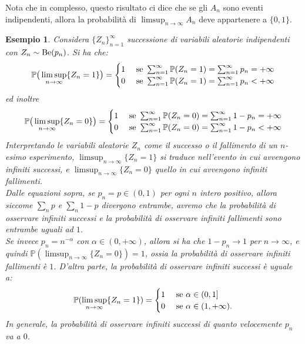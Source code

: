 \documentclass[11pt]{book}
\theoremstyle{Definizione}
\theoremstyle{TeoremaProposizioneLemmaCorollario}
\theoremstyle{OsservazioneNota}
\newtheorem{myes}{Esempio}[section]
\renewcommand{\P}{\mathbb{P}}
\begin{document}
\noindent
Nota che in complesso, questo risultato ci dice che se gli $A_n$ sono eventi indipendenti, allora la probabilità di $\limsup_{n \to \infty} A_n$  deve appartenere a $\{0,1\}$.
\begin{myes}
Considera $\{Z_n\}_{n = 1}^\infty$ successione di variabili aleatorie indipendenti con $Z_n \sim \textup{Be}(p_n)$. Si ha che:
$$
\P\big(\limsup_{n \to \infty} \{Z_n = 1\}\big) = \begin{cases}
1 &\textup{ se } \sum_{n = 1}^\infty \P(Z_n = 1) = \sum_{n = 1}^\infty p_n = +\infty\\
0 &\textup{ se } \sum_{n = 1}^\infty \P(Z_n = 1) = \sum_{n = 1}^\infty p_n < +\infty
\end{cases}
$$
ed inoltre
$$
\P\big(\limsup_{n \to \infty} \{Z_n = 0\}\big) = \begin{cases}
1 &\textup{ se } \sum_{n = 1}^\infty \P(Z_n = 0) = \sum_{n = 1}^\infty 1-p_n = +\infty\\
0 &\textup{ se } \sum_{n = 1}^\infty \P(Z_n = 0) = \sum_{n = 1}^\infty 1-p_n < +\infty
\end{cases}
$$
Interpretando le variabili aleatorie $Z_n$ come il successo o il fallimento di un $n$-esimo esperimento, $\limsup_{n \to \infty} \{Z_n = 1\}$ si traduce nell'evento in cui avvengono infiniti successi, e $\limsup_{n \to \infty} \{Z_n = 0\}$ quello in cui avvengono infiniti fallimenti.\\
Dalle equazioni sopra, se $p_n = p\in (0,1)$ per ogni $n$ intero positivo, allora siccome $\sum_n p$ e $\sum_n 1-p$ divergono entrambe, avremo che la probabilità di osservare infiniti successi e la probabilità di osservare infiniti fallimenti sono entrambe uguali ad $1$.\\
Se invece $p_n = n^{-\alpha}$ con $\alpha\in (0,+\infty)$, allora si ha che $1-p_n \to 1$ per $n \to \infty$, e quindi $\P(\limsup_{n \to \infty} \{Z_n = 0\}) = 1$, ossia la probabilità di osservare infiniti fallimenti è $1$. D'altra parte, la probabilità di osservare infiniti successi è uguale a:
$$
\P(\limsup_{n \to \infty} \{Z_n = 1\}) = \begin{cases}
1 &\textup{ se } \alpha\in (0,1]\\
0 &\textup{ se }\alpha\in (1,+\infty).
\end{cases}
$$
In generale, la probabilità di osservare infiniti successi di quanto velocemente $p_n$ va a $0$.
\end{myes}
\end{document}
